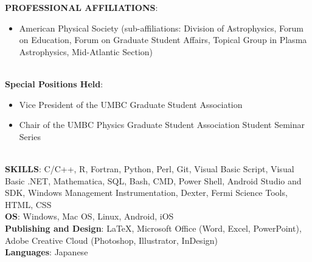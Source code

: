 \documentclass{article}
\begin{document}
\noindent \textbf{PROFESSIONAL AFFILIATIONS}:
\begin{itemize}
\item American Physical Society (sub-affiliations: Division of Astrophysics, Forum on Education, Forum on Graduate Student Affairs, Topical Group in Plasma Astrophysics, Mid-Atlantic Section)
\end{itemize}
\phantom \\
\noindent \textbf{Special Positions Held}:
\begin{itemize}
\item Vice President of the UMBC Graduate Student Association
\item Chair of the UMBC Physics Graduate Student Association Student Seminar Series
\end{itemize}
\phantom \\
\noindent \textbf{SKILLS}: C/C++, R, Fortran, Python, Perl, Git, Visual Basic Script, Visual Basic .NET, Mathematica, SQL, Bash, CMD, Power Shell, Android Studio and SDK, Windows Management Instrumentation, Dexter, Fermi Science Tools, HTML, CSS\\
\noindent \textbf{OS}: Windows, Mac OS, Linux, Android, iOS\\
\noindent \textbf{Publishing and Design}: LaTeX, Microsoft Office (Word, Excel, PowerPoint), Adobe Creative Cloud (Photoshop, Illustrator, InDesign)\\
\noindent \textbf{Languages}: Japanese\\
\newline 
\end{document}
